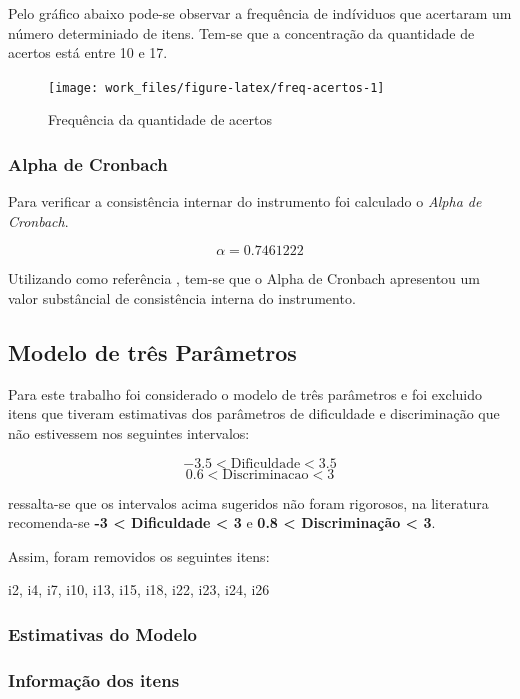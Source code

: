 \documentclass[]{article}
\begin{document}
Pelo gráfico abaixo pode-se observar a frequência de indíviduos que
acertaram um número determiniado de itens. Tem-se que a concentração da
quantidade de acertos está entre 10 e 17.

\begin{figure}[H]

{\centering \texttt{[image: work\_files/figure-latex/freq-acertos-1]} 

}

\caption{Frequência da quantidade de acertos}\label{fig:freq-acertos}
\end{figure}

\subsubsection{Alpha de Cronbach}\label{alpha-de-cronbach}

Para verificar a consistência internar do instrumento foi calculado o
\emph{Alpha de Cronbach}.

\[\alpha = 0.7461222\]

Utilizando como referência \citet{landis}, tem-se que o Alpha de
Cronbach apresentou um valor substâncial de consistência interna do
instrumento.

\subsection{Modelo de três Parâmetros}\label{modelo-de-tres-parametros}

Para este trabalho foi considerado o modelo de três parâmetros e foi
excluido itens que tiveram estimativas dos parâmetros de dificuldade e
discriminação que não estivessem nos seguintes intervalos:

\[-3.5 < \text{Dificuldade} < 3.5\] \[0.6 < \text{Discriminacao} < 3\]

ressalta-se que os intervalos acima sugeridos não foram rigorosos, na
literatura recomenda-se \textbf{-3 \textless{} Dificuldade \textless{}
3} e \textbf{0.8 \textless{} Discriminação \textless{} 3}.

Assim, foram removidos os seguintes itens:

i2, i4, i7, i10, i13, i15, i18, i22, i23, i24, i26

\subsubsection{Estimativas do Modelo}\label{estimativas-do-modelo}

\subsubsection{Informação dos itens}\label{informacao-dos-itens}
\end{document}
